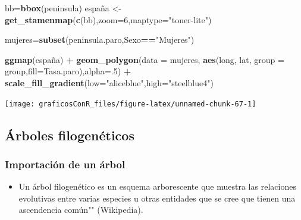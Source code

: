\documentclass[]{article}
\newenvironment{Shaded}{\begin{snugshade}}{\end{snugshade}}
\newcommand{\DataTypeTok}[1]{\textcolor[rgb]{0.13,0.29,0.53}{#1}}
\newcommand{\DecValTok}[1]{\textcolor[rgb]{0.00,0.00,0.81}{#1}}
\newcommand{\KeywordTok}[1]{\textcolor[rgb]{0.13,0.29,0.53}{\textbf{#1}}}
\newcommand{\NormalTok}[1]{#1}
\newcommand{\OperatorTok}[1]{\textcolor[rgb]{0.81,0.36,0.00}{\textbf{#1}}}
\newcommand{\StringTok}[1]{\textcolor[rgb]{0.31,0.60,0.02}{#1}}
\providecommand{\tightlist}{%
  \setlength{\itemsep}{0pt}\setlength{\parskip}{0pt}}
\numberwithin{ejcnt}{section}
\begin{document}
\begin{Shaded}
\begin{Highlighting}[]
\NormalTok{bb=}\KeywordTok{bbox}\NormalTok{(peninsula)}
\NormalTok{españa <-}\StringTok{ }\KeywordTok{get_stamenmap}\NormalTok{(}\KeywordTok{c}\NormalTok{(bb),}\DataTypeTok{zoom=}\DecValTok{6}\NormalTok{,}\DataTypeTok{maptype=}\StringTok{"toner-lite"}\NormalTok{)}

\NormalTok{mujeres=}\KeywordTok{subset}\NormalTok{(peninsula.paro,Sexo}\OperatorTok{==}\StringTok{"Mujeres"}\NormalTok{)}

\KeywordTok{ggmap}\NormalTok{(españa) }\OperatorTok{+}\StringTok{ }\KeywordTok{geom_polygon}\NormalTok{(}\DataTypeTok{data =}\NormalTok{ mujeres, }\KeywordTok{aes}\NormalTok{(long, lat, }\DataTypeTok{group =}\NormalTok{ group,}\DataTypeTok{fill=}\NormalTok{Tasa.paro),}\DataTypeTok{alpha=}\NormalTok{.}\DecValTok{5}\NormalTok{) }\OperatorTok{+}
\KeywordTok{scale_fill_gradient}\NormalTok{(}\DataTypeTok{low=}\StringTok{"aliceblue"}\NormalTok{,}\DataTypeTok{high=}\StringTok{"steelblue4"}\NormalTok{)}
\end{Highlighting}
\end{Shaded}

\begin{center}\texttt{[image: graficosConR\_files/figure-latex/unnamed-chunk-67-1]} \end{center}

\hypertarget{arboles-filogeneticos}{%
\subsection{Árboles filogenéticos}\label{arboles-filogeneticos}}

\hypertarget{importacion-de-un-arbol}{%
\subsubsection{Importación de un árbol}\label{importacion-de-un-arbol}}

\begin{itemize}
\tightlist
\item
  Un árbol filogenético es un esquema arborescente que muestra las relaciones evolutivas entre varias especies u otras entidades que se cree que tienen una ascendencia común"" (Wikipedia).
\end{itemize}
\end{document}
